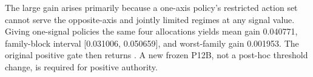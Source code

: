 {}
\markdownRendererSectionEnd \markdownRendererSectionBegin
{}\markdownRendererInterblockSeparator
{}The large gain arises primarily because a one-axis policy's restricted action set cannot serve the opposite-axis and jointly limited regimes at any signal value.\markdownRendererInterblockSeparator
{}Giving one-signal policies the same four allocations yields mean gain 0.040771, family-block interval [0.031006, 0.050659], and worst-family gain 0.001953. The original positive gate then returns . A new frozen P12B, not a post-hoc threshold change, is required for positive authority.
\markdownRendererSectionEnd 
\markdownRendererSectionEnd \markdownRendererDocumentEnd